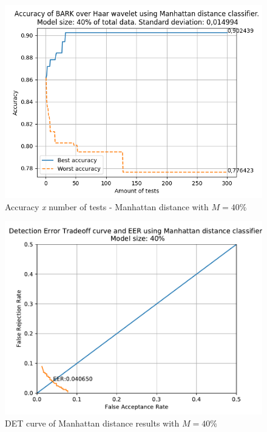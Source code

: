 \begin{figure}[H]
\centering
\includegraphics[scale=.6]{images/results/confusionMatrices/classifier_Manhattan_40.png}
\caption{Accuracy \textit{x} number of tests - Manhattan distance with $M=40\%$}
\label{fig:classifiermanhattan40}
\end{figure}
\begin{figure}[H]
\centering
\includegraphics[scale=.6]{images/results/det/DET_for_classifier_Manhattan_40}
\caption{DET curve of Manhattan distance results with $M=40\%$}
\label{fig:detforclassifiermanhattan40}
\end{figure}
